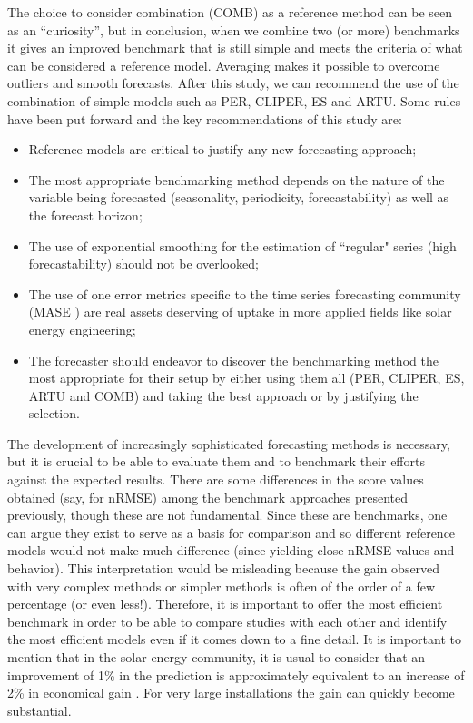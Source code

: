 The choice to consider combination (COMB) as a reference method can be seen as an ``curiosity'', but in conclusion, when we combine two (or more) benchmarks it gives an improved benchmark that is still simple and meets the criteria of what can be considered a reference model. Averaging makes it possible to overcome outliers and smooth forecasts. After this study, we can recommend the use of the combination of simple models such as PER, CLIPER, ES and ARTU. Some rules have been put forward and the key recommendations of this study are:
\begin{itemize}[label=$\looparrowright$]  
\item Reference models are critical to justify any new forecasting approach;
\item The most appropriate benchmarking method depends on the nature of the variable being forecasted (seasonality, periodicity, forecastability) as well as the forecast horizon;
\item  The use of exponential smoothing for the estimation of ``regular" series (high forecastability) should not be overlooked;
\item The use of one error metrics specific to the time series forecasting community (MASE ) are real assets deserving of uptake in more applied fields like solar energy engineering;
\item The forecaster should endeavor to discover the benchmarking method the most appropriate for their setup by either using them all (PER, CLIPER, ES, ARTU and COMB) and taking the best approach or by justifying the selection.
\end{itemize}

The development of increasingly sophisticated forecasting methods is necessary, but it is crucial to be able to evaluate them and to benchmark their efforts against the expected results. There are some differences in the score values obtained (say, for nRMSE) among the benchmark approaches presented previously, though these are not fundamental. Since these are benchmarks, one can argue they exist to serve as a basis for comparison and so different reference models would not make much difference (since yielding close nRMSE values and behavior). This interpretation would be misleading because the gain observed with very complex methods or simpler methods is often of the order of a few percentage (or even less!). Therefore, it is important to offer the most efficient benchmark in order to be able to compare studies with each other and identify the most efficient models even if it comes down to a fine detail. It is important to mention that in the solar energy community, it is usual to consider that an improvement of 1\% in the prediction is approximately equivalent to an increase of 2\% in economical gain \citep{DAVID2021672}. For very large installations the gain can quickly become substantial.


 
